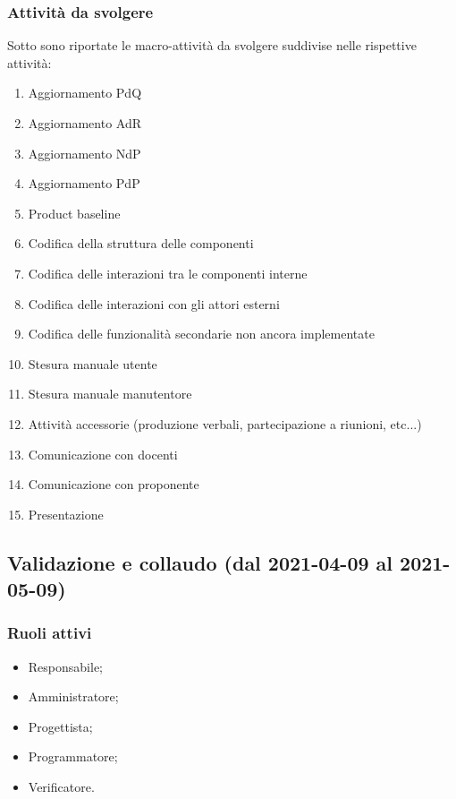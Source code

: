 \subsubsection{Attività da svolgere}
Sotto sono riportate le macro-attività da svolgere suddivise nelle rispettive attività:
\begin{enumerate}
	\item Aggiornamento PdQ
	\item Aggiornamento AdR
	\item Aggiornamento NdP
	\item Aggiornamento PdP
	\item Product baseline
	\item Codifica della struttura delle componenti
	\item Codifica delle interazioni tra le componenti interne
	\item Codifica delle interazioni con gli attori esterni
	\item Codifica delle funzionalità secondarie non ancora implementate
	\item Stesura manuale utente
	\item Stesura manuale manutentore
	\item Attività accessorie (produzione verbali, partecipazione a riunioni, etc...)
	\item Comunicazione con docenti
	\item Comunicazione con proponente
	\item Presentazione
\end{enumerate}


\subsection{Validazione e collaudo (dal 2021-04-09 al 2021-05-09)}


\subsubsection{Ruoli attivi}
\begin{itemize}
	\item Responsabile;
	\item Amministratore;
	\item Progettista;
	\item Programmatore;
	\item Verificatore.
\end{itemize}

